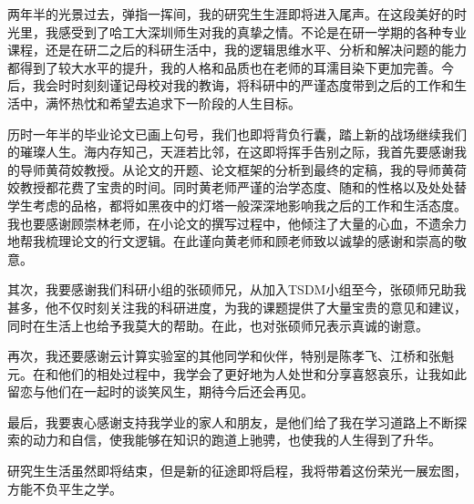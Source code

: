 \begin{acknowledgements}
两年半的光景过去，弹指一挥间，我的研究生生涯即将进入尾声。在这段美好的时光里，我感受到了哈工大深圳师生对我的真挚之情。不论是在研一学期的各种专业课程，还是在研二之后的科研生活中，我的逻辑思维水平、分析和解决问题的能力都得到了较大水平的提升，我的人格和品质也在老师的耳濡目染下更加完善。今后，我会时时刻刻谨记母校对我的教诲，将科研中的严谨态度带到之后的工作和生活中，满怀热忱和希望去追求下一阶段的人生目标。

历时一年半的毕业论文已画上句号，我们也即将背负行囊，踏上新的战场继续我们的璀璨人生。海内存知己，天涯若比邻，在这即将挥手告别之际，我首先要感谢我的导师黄荷姣教授。从论文的开题、论文框架的分析到最终的定稿，我的导师黄荷姣教授都花费了宝贵的时间。同时黄老师严谨的治学态度、随和的性格以及处处替学生考虑的品格，都将如黑夜中的灯塔一般深深地影响我之后的工作和生活态度。我也要感谢顾崇林老师，在小论文的撰写过程中，他倾注了大量的心血，不遗余力地帮我梳理论文的行文逻辑。在此谨向黄老师和顾老师致以诚挚的感谢和崇高的敬意。

其次，我要感谢我们科研小组的张硕师兄，从加入TSDM小组至今，张硕师兄助我甚多，他不仅时刻关注我的科研进度，为我的课题提供了大量宝贵的意见和建议，同时在生活上也给予我莫大的帮助。在此，也对张硕师兄表示真诚的谢意。

再次，我还要感谢云计算实验室的其他同学和伙伴，特别是陈孝飞、江桥和张魁元。在和他们的相处过程中，我学会了更好地为人处世和分享喜怒哀乐，让我如此留恋与他们在一起时的谈笑风生，期待今后还会再见。

最后，我要衷心感谢支持我学业的家人和朋友，是他们给了我在学习道路上不断探索的动力和自信，使我能够在知识的跑道上驰骋，也使我的人生得到了升华。

研究生生活虽然即将结束，但是新的征途即将启程，我将带着这份荣光一展宏图，方能不负平生之学。

\end{acknowledgements}
